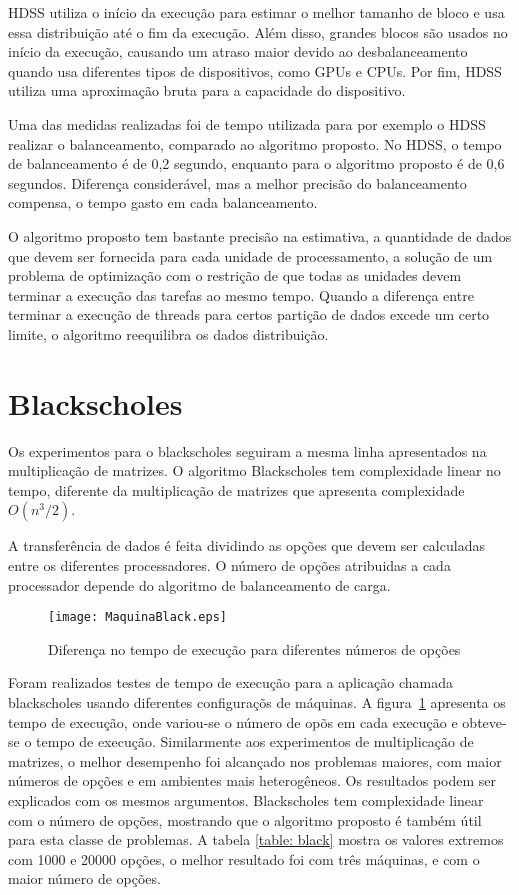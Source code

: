 HDSS utiliza o início da execução para estimar o melhor tamanho de bloco e usa essa distribuição até o fim da execução. Além disso, grandes blocos são usados no início da execução, causando um atraso maior devido ao desbalanceamento quando usa diferentes tipos de dispositivos, como GPUs e CPUs. Por fim, HDSS utiliza uma aproximação bruta para a capacidade do dispositivo. 

Uma das medidas realizadas foi de tempo utilizada para por exemplo o HDSS realizar o balanceamento, comparado ao algoritmo proposto. No HDSS, o tempo de balanceamento é de 0,2 segundo, enquanto para o algoritmo proposto é de 0,6 segundos. Diferença considerável, mas a melhor precisão do balanceamento compensa, o tempo gasto em cada balanceamento.
 
O algoritmo proposto tem  bastante precisão na estimativa,  a quantidade de dados que devem ser fornecida para cada unidade de processamento, a solução de um problema de optimização com o restrição de que todas as unidades devem terminar a execução das tarefas ao mesmo 
tempo. Quando a diferença entre terminar a execução de threads para certos 
partição de dados excede um certo limite, o algoritmo reequilibra os dados 
distribuição.

\section{Blackscholes}

Os experimentos para o blackscholes seguiram a mesma linha apresentados na multiplicação de matrizes. O algoritmo Blackscholes tem complexidade linear no tempo, diferente da multiplicação de matrizes que apresenta complexidade $O(n^3/2)$. 

A transferência de dados é feita dividindo as opções que devem ser calculadas entre os diferentes processadores. O número de opções atribuidas a cada processador depende do algoritmo de balanceamento de carga. 

\begin{figure}[htb]
	\begin{center}
	\centering
			\texttt{[image: MaquinaBlack.eps]}
	\caption{Diferença no tempo de execução para diferentes números de opções}
	\label{fig:black}
	\end{center}
\end{figure}

Foram realizados testes de tempo de execução para a aplicação chamada blackscholes usando diferentes configuraçõs de máquinas. A figura~\ref{fig:black} apresenta os tempo de execução, onde variou-se o número de opõs em cada execução e obteve-se o tempo de execução. Similarmente aos experimentos de multiplicação de matrizes, o melhor desempenho foi alcançado nos problemas maiores, com maior números de opções e em ambientes mais heterogêneos. Os resultados podem ser explicados com os mesmos argumentos. Blackscholes tem complexidade linear com o número de opções, mostrando que o algoritmo proposto é também útil para esta classe de problemas. A tabela  \ref{table: black} mostra os valores extremos com 1000 e 20000 opções, o melhor resultado foi com três máquinas, e com o maior número de opções.

